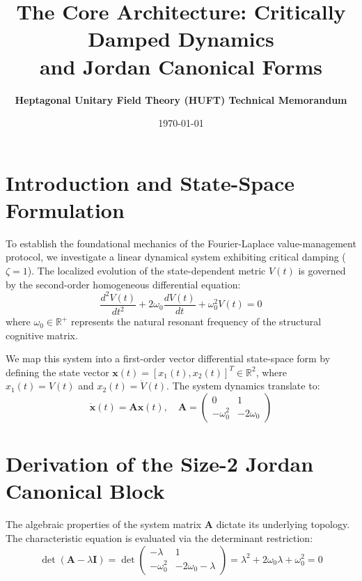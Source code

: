 \documentclass[11pt,preview]{article}
\begin{document}
\title{\textbf{The Core Architecture: Critically Damped Dynamics \\ and Jordan Canonical Forms}}
\author{\textbf{Heptagonal Unitary Field Theory (HUFT) Technical Memorandum}}
\date{\today}
\maketitle

\section{Introduction and State-Space Formulation}
To establish the foundational mechanics of the Fourier-Laplace value-management protocol, we investigate a linear dynamical system exhibiting critical damping ($\zeta = 1$). The localized evolution of the state-dependent metric $V(t)$ is governed by the second-order homogeneous differential equation:
\begin{equation}
    \frac{d^2 V(t)}{dt^2} + 2\omega_0 \frac{dV(t)}{dt} + \omega_0^2 V(t) = 0
\end{equation}
where $\omega_0 \in \mathbb{R}^+$ represents the natural resonant frequency of the structural cognitive matrix. 

We map this system into a first-order vector differential state-space form by defining the state vector $\mathbf{x}(t) = [x_1(t), x_2(t)]^T \in \mathbb{R}^2$, where $x_1(t) = V(t)$ and $x_2(t) = \dot{V}(t)$. The system dynamics translate to:
\begin{equation}
    \mathbf{\dot{x}}(t) = \mathbf{A}\mathbf{x}(t), \quad \mathbf{A} = \begin{pmatrix} 0 & 1 \\ -\omega_0^2 & -2\omega_0 \end{pmatrix}
\end{equation}

\section{Derivation of the Size-2 Jordan Canonical Block}
The algebraic properties of the system matrix $\mathbf{A}$ dictate its underlying topology. The characteristic equation is evaluated via the determinant restriction:
\begin{equation}
    \det(\mathbf{A} - \lambda \mathbf{I}) = \det\begin{pmatrix} -\lambda & 1 \\ -\omega_0^2 & -2\omega_0 - \lambda \end{pmatrix} = \lambda^2 + 2\omega_0\lambda + \omega_0^2 = 0
\end{equation}
\end{document}

